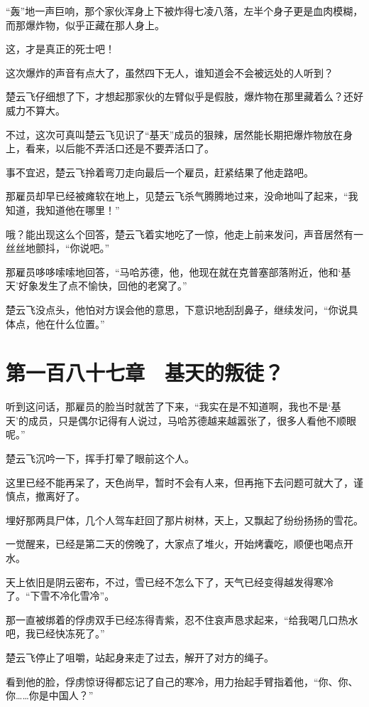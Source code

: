 “轰”地一声巨响，那个家伙浑身上下被炸得七凌八落，左半个身子更是血肉模糊，而那爆炸物，似乎正藏在那人身上。

这，才是真正的死士吧！

这次爆炸的声音有点大了，虽然四下无人，谁知道会不会被远处的人听到？

楚云飞仔细想了下，才想起那家伙的左臂似乎是假肢，爆炸物在那里藏着么？还好威力不算大。

不过，这次可真叫楚云飞见识了“基天”成员的狠辣，居然能长期把爆炸物放在身上，看来，以后能不弄活口还是不要弄活口了。

事不宜迟，楚云飞拎着弯刀走向最后一个雇员，赶紧结果了他走路吧。

那雇员却早已经被瘫软在地上，见楚云飞杀气腾腾地过来，没命地叫了起来，“我知道，我知道他在哪里！”

哦？能出现这么个回答，楚云飞着实地吃了一惊，他走上前来发问，声音居然有一丝丝地颤抖，“你说吧。”

那雇员哆哆嗦嗦地回答，“马哈苏德，他，他现在就在克普塞部落附近，他和‘基天’好象发生了点不愉快，回他的老窝了。”

楚云飞没点头，他怕对方误会他的意思，下意识地刮刮鼻子，继续发问，“你说具体点，他在什么位置。”

\section{第一百八十七章　基天的叛徒？}

听到这问话，那雇员的脸当时就苦了下来，“我实在是不知道啊，我也不是‘基天’的成员，只是偶尔记得有人说过，马哈苏德越来越嚣张了，很多人看他不顺眼呢。”

楚云飞沉吟一下，挥手打晕了眼前这个人。

这里已经不能再呆了，天色尚早，暂时不会有人来，但再拖下去问题可就大了，谨慎点，撤离好了。

埋好那两具尸体，几个人驾车赶回了那片树林，天上，又飘起了纷纷扬扬的雪花。

一觉醒来，已经是第二天的傍晚了，大家点了堆火，开始烤囊吃，顺便也喝点开水。

天上依旧是阴云密布，不过，雪已经不怎么下了，天气已经变得越发得寒冷了。“下雪不冷化雪冷”。

那一直被绑着的俘虏双手已经冻得青紫，忍不住哀声恳求起来，“给我喝几口热水吧，我已经快冻死了。”

楚云飞停止了咀嚼，站起身来走了过去，解开了对方的绳子。

看到他的脸，俘虏惊讶得都忘记了自己的寒冷，用力抬起手臂指着他，“你、你、你……你是中国人？”

